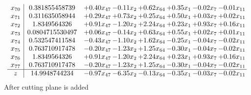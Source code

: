\documentclass[8pt]{article}
\begin{document}
\[\begin{array}{c| c c@{\hskip 2pt} c@{\hskip 2pt} c@{\hskip 2pt} c@{\hskip 2pt} c@{\hskip 2pt} c@{\hskip 2pt} }
 x_{70}   &  0.381855458739 & +  0.40 x_{47} & -0.11 x_{2} & +  0.62 x_{64} & +  0.35 x_{1} & -0.02 x_{7} & -0.01 x_{11}\\
 x_{71}   &  0.311635058944 & +  0.29 x_{47} & +  0.73 x_{2} & +  0.25 x_{64} & +  0.50 x_{1} & +  0.03 x_{7} & +  0.02 x_{11}\\
 x_{72}   &  1.8349564326 & +  0.91 x_{47} & -1.20 x_{2} & +  2.24 x_{64} & +  0.23 x_{1} & +  0.93 x_{7} & +  0.16 x_{11}\\
 x_{73}   &  0.0804715530497 & +  0.06 x_{47} & -0.14 x_{2} & +  0.63 x_{64} & +  0.55 x_{1} & +  0.02 x_{7} & +  0.01 x_{11}\\
 x_{74}   &  0.532547411584 & -0.43 x_{47} & -1.10 x_{2} & +  1.62 x_{64} & -0.25 x_{1} & -0.04 x_{7} & -0.02 x_{11}\\
 x_{75}   &  0.763710917478 & -0.20 x_{47} & -1.23 x_{2} & +  1.25 x_{64} & -0.30 x_{1} & -0.04 x_{7} & -0.02 x_{11}\\
 x_{76}   &  1.8349564326 & +  0.91 x_{47} & -1.20 x_{2} & +  2.24 x_{64} & +  0.23 x_{1} & +  0.93 x_{7} & +  0.16 x_{11}\\
 x_{77}   &  0.763710917478 & -0.20 x_{47} & -1.23 x_{2} & +  1.25 x_{64} & -0.30 x_{1} & -0.04 x_{7} & -0.02 x_{11}\\
\hline
z    &  14.9948744234 & -0.97 x_{47} & -6.35 x_{2} & -0.13 x_{64} & -0.35 x_{1} & -0.03 x_{7} & -0.02 x_{11}\\
\end{array}\]
 After cutting plane is added 
\end{document}
